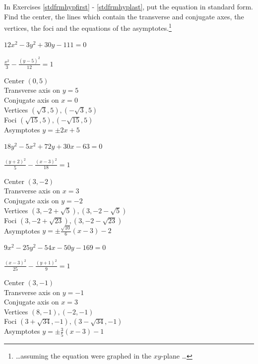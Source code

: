 \documentclass{ximera}
\begin{document}
\begin{question}
In Exercises \ref{stdfrmhypfirst} - \ref{stdfrmhyplast}, put the equation in standard form.  Find the center, the lines which contain the transverse and conjugate axes, the vertices, the foci and the equations of the asymptotes.\footnote{ \ldots assuming the equation were graphed in the $xy$-plane \ldots}

\begin{problem}\label{stdfrmhypfirst}  \label{oddhypenine}
     $12x^{2} - 3y^{2} + 30y - 111 = 0$  

\begin{solution}
    $\frac{x^{2}}{3} - \frac{(y - 5)^{2}}{12} = 1$

Center $(0, 5)$\\
Transverse axis on $y = 5$\\
Conjugate axis on $x = 0$\\
Vertices $(\sqrt{3}, 5), (-\sqrt{3}, 5)$\\
Foci $(\sqrt{15}, 5), (-\sqrt{15}, 5)$\\
Asymptotes $y = \pm 2x + 5$
\end{solution}
     
\end{problem}

\begin{problem}
    $18y^{2} - 5x^{2} +  72y + 30x - 63= 0$

\begin{solution}
     $\frac{(y + 2)^{2}}{5} - \frac{(x - 3)^{2}}{18} = 1$

Center $(3, -2)$\\
Transverse axis on $x = 3$\\
Conjugate axis on $y = -2$\\
Vertices $(3, -2 + \sqrt{5}), (3, -2 - \sqrt{5})$\\
Foci $(3, -2 + \sqrt{23}), (3, -2 - \sqrt{23})$\\
Asymptotes $y = \pm \frac{\sqrt{10}}{6}(x - 3) - 2$
\end{solution}
    
\end{problem}

\begin{problem}\label{oddhypeeleven}
     $9x^2-25y^2-54x-50y-169 = 0$

\begin{solution}
    $\frac{(x-3)^{2}}{25} - \frac{(y+1)^{2}}{9} = 1$

Center $(3, -1)$\\
Transverse axis on $y=-1$\\
Conjugate axis on $x=3$\\
Vertices $(8, -1), (-2, -1)$\\
Foci $\left(3+\sqrt{34}, -1 \right), \left(3-\sqrt{34}, -1 \right)$\\
Asymptotes $y = \pm \frac{3}{5}(x - 3) - 1$
\end{solution}
     

\end{problem}
\end{question}
\end{document}
